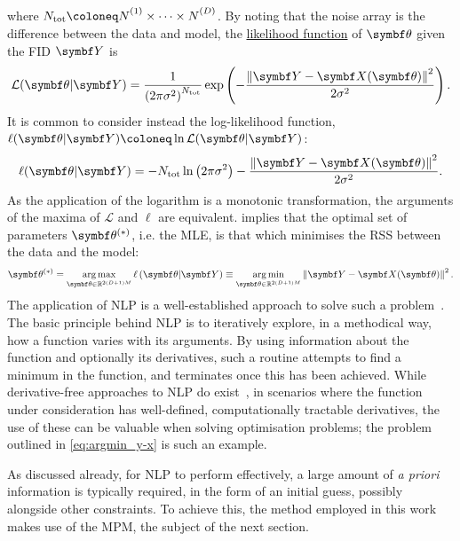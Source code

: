 where $N_{\text{tot}} \coloneq \None \times \cdots \times \ND$.
By noting that the noise array is the difference between the data and model,
the \ul{likelihood function} of $\bth$ given the \ac{FID} $\bY$ is
\begin{equation}
    \mathcal{L}(\bth \vert \bY) =
        \frac{1}{\left(2\pi \sigma^2\right)^{N_{\text{tot}}}}
        \exp\left( -\frac{\left\lVert \bY - \bX(\bth) \right\rVert^2}{2\sigma^2}\right).
\end{equation}
It is common to consider instead the log-likelihood function,
$\ell(\bth \vert \bY) \coloneq \ln \mathcal{L}(\bth \vert
\bY)$:
\begin{equation}
\ell(\bth \vert \bY) =
-N_{\text{tot}} \ln\left(2 \pi \sigma^2\right)
-\frac{\left\lVert \bY - \bX(\bth) \right\rVert^2}{2\sigma^2}.
\label{eq:log-likeihood}
\end{equation}
As the application of the logarithm is a monotonic transformation, the
arguments of the maxima of $\mathcal{L}$ and $\ell$ are equivalent.
 implies that the optimal set of parameters
$\bth^{(*)}$, i.e. the \ac{MLE},
is that which minimises the \ac{RSS} between the data and the model:
\begin{equation}
\bthstar = \argmax_{\bth \in \mathbb{R}^{2(D+1)M}}
\ell\left(\bth \vert \bY\right) \equiv
\argmin_{\bth \in \mathbb{R}^{2(D+1)M}} \left\lVert \bY - \bX(\bth) \right\rVert^2.
\label{eq:argmin_y-x}
\end{equation}
The application of \ac{NLP} is a well-established approach to solve such a
problem~\cite{Nocedal2006,Fletcher1987}. The basic principle behind \ac{NLP} is
to iteratively explore, in a methodical way, how a function varies with its
arguments. By using information about the function and optionally its
derivatives, such a routine attempts to find a minimum in the function, and
terminates once this has been achieved. While derivative-free approaches to
\ac{NLP} do exist~\cite{Nelder1965,Kirkpatrick1983,Powell2009},
in scenarios where the function under consideration has well-defined,
computationally tractable derivatives, the use of these can be valuable when
solving optimisation problems; the problem outlined in
\cref{eq:argmin_y-x} is such an example.

As discussed already, for \ac{NLP} to perform effectively, a large amount of
\textit{a priori} information is typically required, in the form of an initial
guess, possibly alongside other constraints. To achieve this, the method
employed in this work makes use of the \ac{MPM}, the subject of the next
section.
